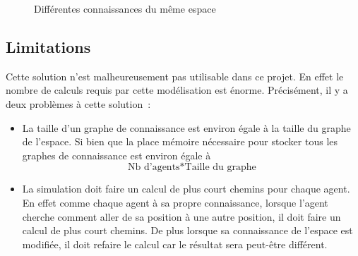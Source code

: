 \documentclass[a4paper]{article}
\begin{document}
\newcommand{\ABC}{
  \node[place] (A) at (0,2) {A};
  \node[place] (B) at (2,2) {B};
  \node[place] (C) at (1,0) {C};
}
\newcommand{\espaceReel}{
  \ABC;
  \node[place] (D) at (5,-1) {D};
  \draw (A) -- (C) -- (B) -- (A);
  \draw (C) -- (D) -- (B);
  \node[connaissance]  at (2.5,-2) {Espace réel};
}
\begin{figure}
  \caption{Différentes connaissances du même espace}
  \label{fig:connaissance}
  \centering
\end{figure}

  \subsection{Limitations}

Cette solution n'est malheureusement pas utilisable dans ce projet. En effet le
nombre de calculs requis par cette modélisation est énorme.
Précisément, il y a deux problèmes à cette solution~:

\begin{itemize}
  \item

La taille d'un graphe de connaissance est environ égale à la taille du
graphe de l'espace. Si bien que la place mémoire nécessaire pour stocker
tous les graphes de connaissance est environ égale à \[\text{Nb d'agents} *
\text{Taille du graphe}\]

  \item

La simulation doit faire un calcul de plus court chemins pour chaque
agent. En effet comme chaque agent à sa propre connaissance, lorsque l'agent
cherche comment aller de sa position à une autre position, il doit faire un
calcul de plus court chemins. De plus lorsque sa connaissance de l'espace
est modifiée, il doit refaire le calcul car le résultat sera peut-être
différent.

\end{itemize}
\end{document}
